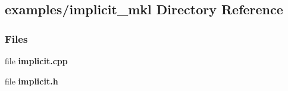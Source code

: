 \subsection{examples/implicit\+\_\+mkl Directory Reference}
\label{dir_e4cd78897627cb0aad520d95d3f2770b}
\subsubsection*{Files}
\begin{DoxyCompactItemize}
\item 
file {\bf implicit.\+cpp}
\item 
file {\bf implicit.\+h}
\end{DoxyCompactItemize}
